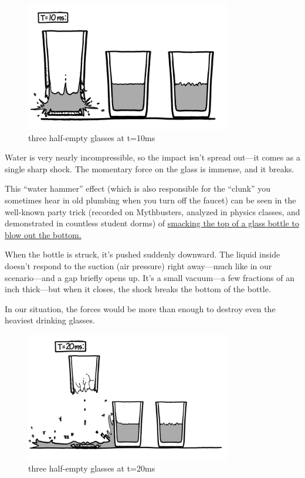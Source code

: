 \begin{figure}[!htbp]
\centering
\includegraphics[scale=0.5, max width=0.8\textwidth]{imgs/a/6/glass_10ms.png}
\caption{three half-empty glasses at t=10ms}
\end{figure}

{Water is very nearly incompressible, so the impact isn’t spread out—it comes as a single sharp shock. The momentary force on the glass is immense, and it breaks.}

{This “water hammer” effect (which is also responsible for the “clunk” you sometimes hear in old plumbing when you turn off the faucet) can be seen in the well-known party trick (recorded on Mythbusters, analyzed in physics classes, and demonstrated in countless student dorms) of \href{http://www.youtube.com/watch?v=77gWkl0ZUC8}{smacking the top of a glass bottle to blow out the bottom.}}

{When the bottle is struck, it’s pushed suddenly downward. The liquid inside doesn’t respond to the suction (air pressure) right away—much like in our scenario—and a gap briefly opens up. It’s a small vacuum—a few fractions of an inch thick—but when it closes, the shock breaks the bottom of the bottle.}

{In our situation, the forces would be more than enough to destroy even the heaviest drinking glasses.}

\begin{figure}[!htbp]
\centering
\includegraphics[scale=0.5, max width=0.8\textwidth]{imgs/a/6/glass_20ms.png}
\caption{three half-empty glasses at t=20ms}
\end{figure}


